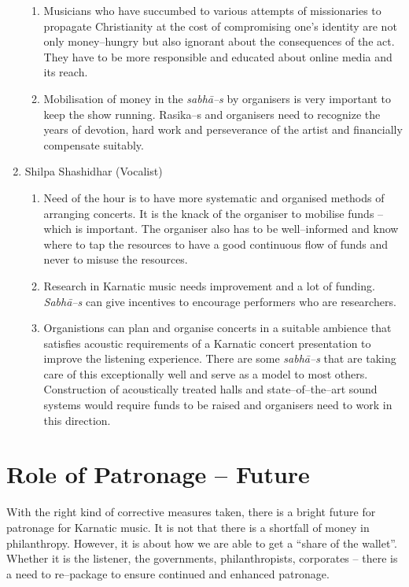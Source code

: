 \begin{enumerate}
\begin{enumerate}
 \item Musicians who have succumbed to various attempts of missionaries to propagate Christianity at the cost of compromising one’s identity are not only money–hungry but also ignorant about the consequences of the act. They have to be more responsible and educated about online media and its reach.

 \item Mobilisation of money in the \textit{sabhā–s} by organisers is very important to keep the show running. Rasika–s and organisers need to recognize the years of devotion, hard work and perseverance of the artist and financially compensate suitably.
\end{enumerate}

 \item Shilpa Shashidhar (Vocalist)
 
\begin{enumerate}
\item Need of the hour is to have more systematic and organised methods of arranging concerts. It is the knack of the organiser to mobilise funds – which is important. The organiser also has to be well–informed and know where to tap the resources to have a good continuous flow of funds and never to misuse the resources.

 \item Research in Karnatic music needs improvement and a lot of funding. \textit{Sabhā–s} can give incentives to encourage performers who are researchers.

 \item Organistions can plan and organise concerts in a suitable ambience that satisfies acoustic requirements of a Karnatic concert presentation to improve the listening experience. There are some \textit{sabhā–s} that are taking care of this exceptionally well and serve as a model to most others. Construction of acoustically treated halls and state–of–the–art sound systems would require funds to be raised and organisers need to work in this direction.
\end{enumerate}

\end{enumerate}


\section*{Role of Patronage – Future}

With the right kind of corrective measures taken, there is a bright future for patronage for Karnatic music. It is not that there is a shortfall of money in philanthropy. However, it is about how we are able to get a “share of the wallet”. Whether it is the listener, the governments, philanthropists, corporates – there is a need to re–package to ensure continued and enhanced patronage.

